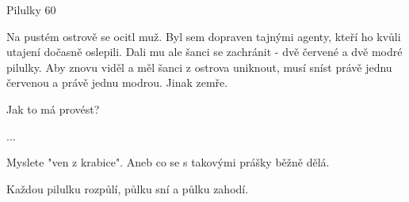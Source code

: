 Pilulky
60%

Na pustém ostrově se ocitl muž. Byl sem dopraven tajnými agenty, kteří ho kvůli utajení dočasně oslepili. Dali mu ale šanci se zachránit - dvě červené a dvě modré pilulky. Aby znovu viděl a měl šanci z ostrova uniknout, musí sníst právě jednu červenou a právě jednu modrou. Jinak zemře.

Jak to má provést?

...

Myslete "ven z krabice". Aneb co se s takovými prášky běžně dělá.

Každou pilulku rozpůlí, půlku sní a půlku zahodí.